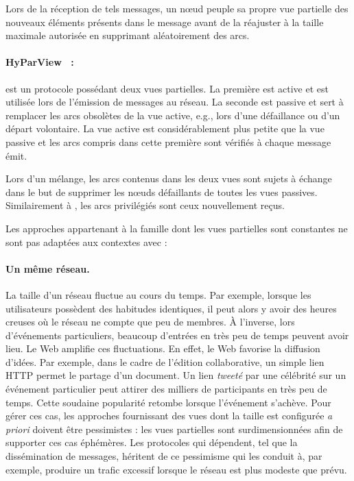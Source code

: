 \noindent Lors de la réception de tels messages, un nœud peuple sa propre vue
partielle des nouveaux éléments présents dans le message avant de la réajuster à
la taille maximale autorisée en supprimant aléatoirement des arcs.

\paragraph{HyParView~\cite{leitao2007dependable} :} est un protocole possédant
deux vues partielles. La première est active et est utilisée lors de l'émission
de messages au réseau. La seconde est passive et sert à remplacer les arcs
obsolètes de la vue active, e.g., lors d'une défaillance ou d'un départ
volontaire.  La vue active est considérablement plus petite que la vue passive
et les arcs compris dans cette première sont vérifiés à chaque message émit.

\noindent Lors d'un mélange, les arcs contenus dans les deux vues sont sujets à
échange dans le but de supprimer les nœuds défaillants de toutes les vues
passives. Similairement à \CYCLON, les arcs privilégiés sont ceux nouvellement
reçus.


Les approches appartenant à la famille dont les vues partielles
sont constantes ne sont pas adaptées aux contextes avec :

\paragraph{Un même réseau.} La taille d'un réseau fluctue au cours du temps. Par
exemple, lorsque les utilisateurs possèdent des habitudes identiques, il peut
alors y avoir des heures creuses où le réseau ne compte que peu de membres. À
l'inverse, lors d'événements particuliers, beaucoup d'entrées en très peu de
temps peuvent avoir lieu. Le Web amplifie ces fluctuations. En effet, le Web
favorise la diffusion d'idées. Par exemple, dans le cadre de l'édition
collaborative, un simple lien HTTP permet le partage d'un document. Un lien
\emph{tweeté} par une célébrité sur un événement particulier peut attirer des
milliers de participants en très peu de temps. Cette soudaine popularité retombe
lorsque l'événement s'achève.  Pour gérer ces cas, les approches fournissant des
vues dont la taille est configurée \emph{a priori} doivent être pessimistes :
les vues partielles sont surdimensionnées afin de supporter ces cas
éphémères. Les protocoles qui dépendent, tel que la dissémination de messages,
héritent de ce pessimisme qui les conduit à, par exemple, produire un trafic
excessif lorsque le réseau est plus modeste que prévu.


